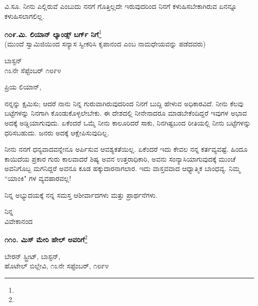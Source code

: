 ವಿ.ಸೂ. \enginline{-}ನೀನು ಎಲ್ಲಿರುವೆ ಎಂಬುದು ನನಗೆ ಗೊತ್ತಿಲ್ಲದೇ ಇರುವುದರಿಂದ ನಿನಗೆ ಕಳುಹಿಸಬೇಕಾಗಿರುವ ಏನನ್ನೂ ಕಳುಹಿಸಲಾಗಲಿಲ್ಲ.

\newpage

\begin{center}
\textbf{೧೦೯.ಮಿ. ಲಿಯಾನ್ ಲ್ಯಾಂಡ್ಸ್ ಬರ್ಗ್ ನಿಗೆ}\footnote{}\\ (ಮುಂದೆ ಸ್ವಾಮಿಜಿಯಿಂದ ಸನ್ಯಾಸ ಸ್ವೀಕರಿಸಿ ಕೃಪಾನಂದ ಎಂಬ ನಾಮಧೇಯವನ್ನು ಪಡೆದವರು)
\end{center}

\vspace{-0.5cm}

\begin{flushright}
ಬಾಸ್ಟನ್\\೧೩ನೇ ಸೆಪ್ಟೆಂಬರ್ ೧೮೯೪
\end{flushright}

\vspace{-0.5cm}

\noindent
ಪ್ರಿಯ ಲಿಯಾನ್,

ನನ್ನನ್ನು ಕ್ಷಮಿಸು; ಆದರೆ ನಾನು ನಿನ್ನ ಗುರುವಾಗಿರುವುದರಿಂದ ನಿನಗೆ ಬುದ್ದಿ ಹೇಳುವ ಅಧಿಕಾರವಿದೆ. ನೀನು ಕೆಲವು ಬಟ್ಟೆಗಳನ್ನು ನಿನಗಾಗಿ ಕೊಂಡುಕೊಳ್ಳಲೇಬೇಕು. ಈ ದೇಶದಲ್ಲಿ ನೀನೇನಾದರೂ ಮಾಡಬೇಕೆಂದಿದ್ದರೆ ಇವುಗಳ ಅಭಾವ ಅದಕ್ಕೆ ಅಡ್ಡಿಯಾಗುವುದು. ಏಕೆಂದರೆ ಒಮ್ಮೆ ನೀನು ಕಾಲೂರಿದರೆ ಸಾಕು, ನಿನಗಿಷ್ಟಬಂದ ರೀತಿಯಲ್ಲಿ ನೀನು ಬಟ್ಟೆಗಳನ್ನು ಧರಿಸಬಹುದು. ಜನರು ಅದಕ್ಕೆ ಆಕ್ಷೇಪಿಸುವುದಿಲ್ಲ.

ನೀನು ನನಗೆ ಧನ್ಯವಾದವನ್ನೇನೂ ಅರ್ಪಿಸುವ ಆವಶ್ಯಕತೆಯಿಲ್ಲ. ಏಕೆಂದರೆ ಇದು ಕೇವಲ ನನ್ನ ಕರ್ತವ್ಯವಷ್ಟೆ. ಹಿಂದೂ ಕಾಯಿದೆಯ ಪ್ರಕಾರ ಗುರು ಕಾಲವಾದರೆ ಶಿಷ್ಯ ಅವನ ಉತ್ತರಾಧಿಕಾರಿ, ಅವನು ಸಂನ್ಯಾಸಿಯಾಗುವುದಕ್ಕೆ ಮುಂಚೆ ಅವನಿಗೊಬ್ಬ ಮಗನಿದ್ದರೆ ಅವನೂ ಕೂಡ ಹಕ್ಕುದಾರನಾಗಲಾರ. ಇದು ವಾಸ್ತವವಾದ ಆಧ್ಯಾತ್ಮಿಕ ಬಾಂಧವ್ಯ. ನಿಮ್ಮ ``ಯಾಂಕಿ" ಗಳ ವ್ಯವಹಾರವಲ್ಲ!

ನಿನ್ನ ಅಭ್ಯುದಯಕ್ಕೆ ನನ್ನ ಸಮಸ್ತ ಆಶೀರ್ವಾದಗಳು ಮತ್ತು ಪ್ರಾರ್ಥನೆಗಳು.

\vspace{-0.5cm}

{\flushright
ನಿನ್ನ\\ವಿವೇಕಾನಂದ\par}

\begin{center}
\textbf{೧೧೦. ಮಿಸ್ ಮೇರಿ ಹೇಲ್‌ ಅವರಿಗೆ}\footnote{}
\end{center}

\vspace{-0.5cm}

\begin{flushright}
ಬೇರನ್ ಸ್ಟ್ರೀಟ್, ಬಾಸ್ಟನ್,\\ಹೊಟೇಲ್ ಬಿಲ್ಲೇವಿ, ೧೩ನೇ ಸಪ್ಟೆಂಬರ್, ೧೮೯೪
\end{flushright}

